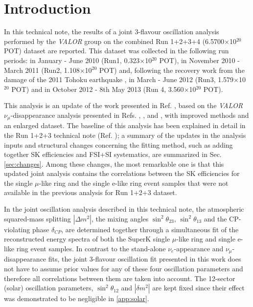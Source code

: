 \clearpage

\section {Introduction }
\label{sec:intro}

In this technical note, 
the results of a joint 3-flavour oscillation analysis
performed by the {\em VALOR} group
on the combined Run 1+2+3+4 (6.5700$\times$10$^{20}$ POT) dataset are reported.
This dataset was collected in the following run periods:
in January - June 2010 (Run1, 0.323$\times$10$^{20}$ POT),
in November 2010 - March 2011 (Run2, 1.108$\times$10$^{20}$ POT) and,
following the recovery work from the damage of the 2011 Tohoku earthquake \cite{earthquake}, 
in March - June 2012 (Run3, 1.579$\times$10$^{20}$ POT) 
and in October 2012 - 8th May 2013 (Run 4, 3.560$\times$10$^{20}$ POT).

This analysis is an update of the work presented in Ref. \cite{OurJointAnalysis}, based on the 
{\em VALOR}  $\nu_{\mu}$-disappearance analysis presented in Refs. \cite{OurRun1DisappAnalysis}, 
\cite{OurRun12DisappAnalysis}, \cite{OurRun12DisappAnalysis3Flavour} and \cite{OurRun123DisappAnalysis3Flavour},
with improved methods and an enlarged dataset. The baseline of this analysis has been explained in detail in the Run 1+2+3 technical note (Ref. \cite{OurJointAnalysis}); a summary of the updates in the analysis inputs and 
structural changes concerning the fitting method, such as adding together SK efficiencies and FSI+SI systematics,
are summarized in Sec.\ref{sec:changes}. Among these changes, the most remarkable one is that this updated joint analysis
contains the correlations between the SK efficiencies for the single $\mu$-like ring and the single e-like ring event samples that were not available in the previous analysis for Run 1+2+3 dataset.

In the joint oscillation analysis described in this technical note,
the atmospheric squared-mass splitting $|\Delta m^{2}|$,
the mixing angles $\sin^{2}\theta_{23}$, $\sin^{2}\theta_{13}$
and the CP-violating phase $\delta_{CP}$,
are determined together through a simultaneous fit of the reconstructed
energy spectra of both the SuperK single $\mu$-like ring and single e-like ring event samples.
In contrast to the stand-alone $\nu_{e}$-appearance and  $\nu_{\mu}$-disappearance fits,
the joint 3-flavour oscillation fit presented in this work does not have to assume prior values for any of these 
four oscillation parameters and therefore all correlations between them are taken into account.
The 12-sector (solar) oscillation parameters, $\sin^{2}\theta_{12}$ and $|\delta m^{2}|$ are kept fixed 
since their effect was demonstrated to be negligible in \ref{app:solar}.

